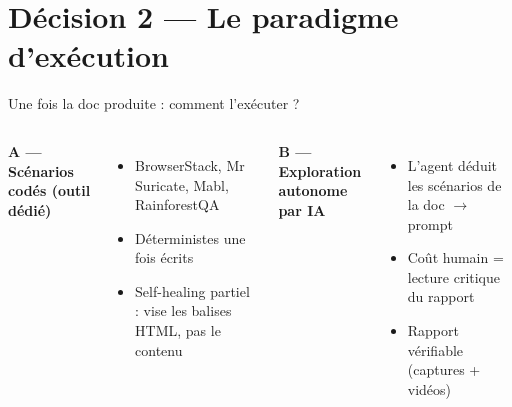 \section{Décision 2 --- Le paradigme d'exécution}

\begin{frame}{Une fois la doc produite : comment l'exécuter ?}
  \begin{columns}[T]
    \textbf{A --- Scénarios codés (outil dédié)}
    \begin{itemize}\footnotesize
      \item BrowserStack, Mr Suricate, Mabl, RainforestQA
      \item Déterministes une fois écrits
      \item Self-healing \alert{partiel} : vise les balises HTML, pas le contenu
    \end{itemize}
    \textbf{B --- Exploration autonome par IA}
    \begin{itemize}\footnotesize
      \item L'agent déduit les scénarios de la doc $\to$ prompt
      \item Coût humain = \alert{lecture critique du rapport}
      \item Rapport vérifiable (captures + vidéos)
    \end{itemize}
  \end{columns}
  \vskip 4pt
\end{frame}

